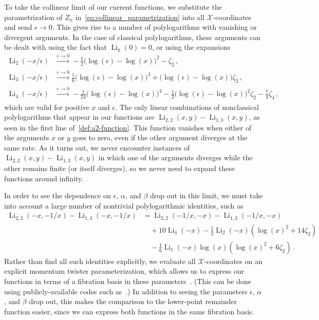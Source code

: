 \documentclass[11pt]{article}
\DeclareMathOperator{\Li}{Li}
\def\x{\mathcal{X}}
\begin{document}
To take the collinear limit of our current functions, we substitute the parametrization of $Z_n$ in~\eqref{eq:collinear_parametrization} into all $\x$-coordinates and send $\epsilon \to 0$. This gives rise to a number of polylogarithms with vanishing or divergent arguments. In the case of classical polylogarithms, these arguments can be dealt with using the fact that $\Li_k(0) = 0$, or using the expansions
\begin{align}
\Li_2(-x/\epsilon) &\xrightarrow[]{\epsilon \to 0} - \frac{1}{2} \big(\log(\epsilon) - \log (x) \big)^2  - \zeta_2 \, ,\\
\Li_3(-x/\epsilon) &\xrightarrow[]{\epsilon \to 0}  \frac{1}{6} \big(\log(\epsilon) - \log (x) \big)^3 + 
\big(\log(\epsilon) - \log (x) \big) \zeta_2   \, ,\\
\Li_4(-x/\epsilon) &\xrightarrow[]{\epsilon \to 0}  -\frac{1}{24} \big(\log(\epsilon) - \log (x) \big)^4 - 
  \frac{1}{2} \big(\log(\epsilon) - \log (x) \big)^2 \zeta_2 - \frac{7}{4} \zeta_4  \, ,
\end{align} 
which are valid for positive $x$ and $\epsilon$. The only linear combinations of nonclassical polylogarithms that appear in our functions are $\Li_{2, 2}(x, y) - \Li_{1, 3}(x, y)$, as seen in the first line of~\eqref{def:a2-function}. This function vanishes when either of the arguments $x$ or $y$ goes to zero, even if the other argument diverges at the same rate. As it turns out, we never encounter instances of $\Li_{2, 2}(x, y) - \Li_{1, 3}(x, y)$ in which one of the arguments diverges while the other remains finite (or itself diverges), so we never need to expand these functions around infinity. 

In order to see the dependence on $\epsilon$, $\alpha$, and $\beta$ drop out in this limit, we must take into account a large number of nontrivial polylogarithmic identities, such as
\begin{align}
\Li_{2, 2}(-x, -1/x) - \Li_{1, 3}(-x, -1/x) &=  \Li_{2, 2}(-1/x, -x) - \Li_{1, 3}(-1/x, -x)  \nonumber \\
&\quad  + 10 \Li_4(-x)  - \frac{1}{2} \Li_2(-x) \left( \log(x)^2 + 14 \zeta_2 \right)   \\ &\quad  - \frac{1}{6} \Li_1(- x) \log(x) \left( \log(x)^2 + 6 \zeta_2 \right) \, .   \nonumber
\end{align}
Rather than find all such identities explicitly, we evaluate all $\x$-coordinates on an explicit momentum twister parameterization, which allows us to express our functions in terms of a fibration basis in these parameters~\cite{Brown:2009qja}. (This can be done using publicly-available codes such as~\cite{Panzer:2014caa,Duhr:2019tlz}.) In addition to seeing the parameters $\epsilon$, $\alpha$, and $\beta$ drop out, this makes the comparison to the lower-point remainder function easier, since we can express both functions in the same fibration basis.
\end{document}
